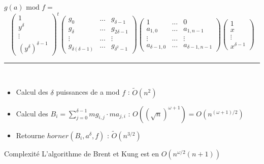 \documentclass[10pt,a4paper]{beamer}
\begin{document}
\begin{frame}
    $g(a)\text{ mod }f =$ 
    \[
    \begin{pmatrix}
        1 \\
        y^\delta \\
        \vdots \\
        (y^\delta)^{\delta-1} 
    \end{pmatrix}^t
    \begin{pmatrix}
        g_0 & ... & g_{\delta-1} \\
        g_{\delta} & ... & g_{2\delta-1} \\
        \vdots & ... & \vdots \\
        g_{\delta(\delta-1)} & ... & g_{\delta^2-1}
    \end{pmatrix}
    \begin{pmatrix}
        1 &  ... & 0 \\
        a_{1,0} & ... & a_{1,n-1} \\
        \vdots &  ... & \vdots \\
        a_{\delta-1,0} & ... & a_{\delta-1,n-1}
    \end{pmatrix}
    \begin{pmatrix}
        1 \\
        x \\
        \vdots \\
        x^{\delta-1}
    \end{pmatrix}
    \]
    \rule{\linewidth}{0.2mm}\\[0.5cm]
    
    \begin{itemize}
        \item Calcul des $\delta$ puissances de a mod $f$ : $\tilde{O}(n^2)$
        \item Calcul des $B_i = \sum_{j=0}^{\delta-1} mg_{i,j}\cdot ma_{j,i}$ : $O((\sqrt{n})^{\omega+1}) = O(n^{(\omega+1)/2})$
        \item Retourne $horner(B_i, a^{\delta}, f)$ : $\tilde{O}(n^{3/2})$
    \end{itemize}
    \begin{alertblock}{Complexité}
        L'algorithme de Brent et Kung est en $O(n^{\omega/2}(n+1))$
    \end{alertblock}
\end{frame}
\end{document}
